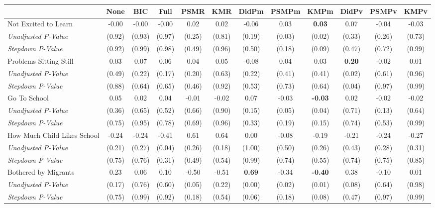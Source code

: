 \begin{tabular}{l c c c c c c c c c c c}
\toprule
 & None & BIC & Full & PSMR & KMR & DidPm & PSMPm & KMPm & DidPv & PSMPv & KMPv \\
\midrule
Not Excited to Learn & -0.00 & -0.00 & -0.00 & 0.02 & 0.02 & -0.06 & 0.03 & \textbf{ 0.03 } & 0.07 & -0.04 & -0.03 \\
\quad \textit{Unadjusted P-Value} & (0.92) & (0.93) & (0.97) & (0.25) & (0.81) & (0.19) & (0.03) & (0.02) & (0.33) & (0.26) & (0.73) \\
\quad \textit{Stepdown P-Value} & (0.92) & (0.99) & (0.98) & (0.49) & (0.96) & (0.50) & (0.18) & (0.09) & (0.47) & (0.72) & (0.99) \\
Problems Sitting Still & 0.03 & 0.07 & 0.06 & 0.04 & 0.05 & -0.08 & 0.04 & 0.03 & \textbf{ 0.20 } & -0.02 & 0.01 \\
\quad \textit{Unadjusted P-Value} & (0.49) & (0.22) & (0.17) & (0.20) & (0.63) & (0.22) & (0.41) & (0.41) & (0.02) & (0.61) & (0.96) \\
\quad \textit{Stepdown P-Value} & (0.88) & (0.64) & (0.65) & (0.46) & (0.92) & (0.53) & (0.73) & (0.64) & (0.04) & (0.97) & (0.99) \\
Go To School & 0.05 & 0.02 & 0.04 & -0.01 & -0.02 & 0.07 & -0.03 & \textbf{ -0.03 } & 0.02 & -0.02 & -0.02 \\
\quad \textit{Unadjusted P-Value} & (0.36) & (0.65) & (0.52) & (0.66) & (0.90) & (0.15) & (0.05) & (0.04) & (0.71) & (0.13) & (0.64) \\
\quad \textit{Stepdown P-Value} & (0.75) & (0.95) & (0.78) & (0.69) & (0.96) & (0.33) & (0.19) & (0.15) & (0.74) & (0.53) & (0.99) \\
How Much Child Likes School & -0.24 & -0.24 & -0.41 & 0.61 & 0.64 & 0.00 & -0.08 & -0.19 & -0.21 & -0.24 & -0.27 \\
\quad \textit{Unadjusted P-Value} & (0.21) & (0.27) & (0.04) & (0.26) & (0.18) & (1.00) & (0.50) & (0.26) & (0.43) & (0.28) & (0.31) \\
\quad \textit{Stepdown P-Value} & (0.75) & (0.76) & (0.31) & (0.49) & (0.54) & (0.99) & (0.74) & (0.55) & (0.74) & (0.75) & (0.85) \\
Bothered by Migrants & 0.23 & 0.06 & 0.10 & -0.50 & -0.51 & \textbf{ 0.69 } & -0.34 & \textbf{ -0.40 } & 0.38 & -0.10 & 0.01 \\
\quad \textit{Unadjusted P-Value} & (0.17) & (0.76) & (0.60) & (0.05) & (0.22) & (0.00) & (0.02) & (0.01) & (0.08) & (0.64) & (0.98) \\
\quad \textit{Stepdown P-Value} & (0.75) & (0.99) & (0.92) & (0.18) & (0.54) & (0.06) & (0.18) & (0.08) & (0.47) & (0.97) & (0.99) \\

\end{tabular}
